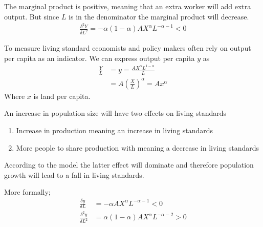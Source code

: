 \documentclass{beamer}
\begin{document}
\begin{frame}
  The marginal product is positive, meaning that an extra worker will add extra output.
  But since $L$ is in the denominator the marginal product will decrease.
  \begin{align}
    \frac{\delta^2Y}{\delta L^2} = -\alpha(1-\alpha)AX^{\alpha}L^{-\alpha-1}<0
  \end{align}
\end{frame}

\begin{frame}
  To measure living standard economists and policy makers often rely on output per capita as an indicator.
  We can express output per capita $y$ as
  \begin{align}
    \frac{Y}{L} &= y = \frac{AX^{\alpha}L^{1-\alpha}}{L}\\
    &= A\left ( \frac{X}{L} \right)^{\alpha} = Ax^{\alpha}
  \end{align}
  Where $x$ is land per capita.
\end{frame}

\begin{frame}
  An increase in population size will have two effects on living standards
  \begin{enumerate}
    \item Increase in production meaning an increase in living standards
    \item More people to share production with meaning a decrease in living standards
  \end{enumerate}
  \medskip
  According to the model the latter effect will dominate and therefore population growth will lead to a fall in living standards.  
\end{frame}

\begin{frame}
 More formally;
 \begin{align}
  \frac{\delta y}{\delta L} &= -\alpha AX^{\alpha}L^{-\alpha-1} <0\\
  \frac{\delta^2 y}{\delta L^2} &= \alpha(1-\alpha)AX^{\alpha}L^{-\alpha-2}>0
 \end{align}  
\end{frame}
\end{document}
